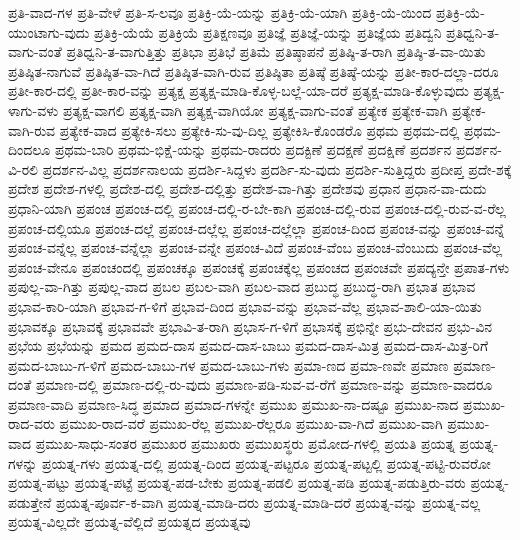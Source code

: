 {ಪ್ರತಿ-ವಾದ-ಗಳ
ಪ್ರತಿ-ವೇಳೆ
ಪ್ರತಿ-ಸ-ಲವೂ
ಪ್ರತಿಕ್ರಿ-ಯೆ-ಯನ್ನು
ಪ್ರತಿಕ್ರಿ-ಯೆ-ಯಾಗಿ
ಪ್ರತಿಕ್ರಿ-ಯೆ-ಯಿಂದ
ಪ್ರತಿಕ್ರಿ-ಯೆ-ಯುಂಟಾಗು-ವುದು
ಪ್ರತಿಕ್ರಿ-ಯೆಯೆ
ಪ್ರತಿಕ್ರಿಯೆ
ಪ್ರತಿಕ್ಷಣವೂ
ಪ್ರತಿಜ್ಞೆ
ಪ್ರತಿಜ್ಞೆ-ಯನ್ನು
ಪ್ರತಿಜ್ಞೆಯ
ಪ್ರತಿದ್ವನಿ
ಪ್ರತಿಧ್ವನಿ-ತ-ವಾಗು-ವಂತೆ
ಪ್ರತಿಧ್ವನಿ-ತ-ವಾಗುತ್ತಿತ್ತು
ಪ್ರತಿಭಾ
ಪ್ರತಿಭೆ
ಪ್ರತಿಮೆ
ಪ್ರತಿಷ್ಠಾಪನೆ
ಪ್ರತಿಷ್ಠಿ-ತ-ರಾಗಿ
ಪ್ರತಿಷ್ಠಿ-ತ-ವಾ-ಯಿತು
ಪ್ರತಿಷ್ಠಿತ-ನಾಗುವೆ
ಪ್ರತಿಷ್ಠಿತ-ವಾ-ಗಿದೆ
ಪ್ರತಿಷ್ಠಿತ-ವಾಗಿ-ರುವ
ಪ್ರತಿಷ್ಠಿತಾ
ಪ್ರತಿಷ್ಠೆ
ಪ್ರತಿಷ್ಠೆ-ಯನ್ನು
ಪ್ರತೀ-ಕಾರ-ದಲ್ಲಾ-ದರೂ
ಪ್ರತೀ-ಕಾರ-ದಲ್ಲಿ
ಪ್ರತೀ-ಕಾರ-ವನ್ನು
ಪ್ರತ್ಯಕ್ಷ
ಪ್ರತ್ಯಕ್ಷ-ಮಾಡಿ-ಕೊಳ್ಳ-ಬಲ್ಲೆ-ಯಾ-ದರೆ
ಪ್ರತ್ಯಕ್ಷ-ಮಾಡಿ-ಕೊಳ್ಳುವುದು
ಪ್ರತ್ಯಕ್ಷ-ಳಾಗು-ವಳು
ಪ್ರತ್ಯಕ್ಷ-ವಾಗಲಿ
ಪ್ರತ್ಯಕ್ಷ-ವಾಗಿ
ಪ್ರತ್ಯಕ್ಷ-ವಾಗಿಯೋ
ಪ್ರತ್ಯಕ್ಷ-ವಾಗು-ವಂತೆ
ಪ್ರತ್ಯೇಕ
ಪ್ರತ್ಯೇಕ-ವಾಗಿ
ಪ್ರತ್ಯೇಕ-ವಾಗಿ-ರುವ
ಪ್ರತ್ಯೇಕ-ವಾದ
ಪ್ರತ್ಯೇಕಿ-ಸಲು
ಪ್ರತ್ಯೇಕಿ-ಸು-ವು-ದಿಲ್ಲ
ಪ್ರತ್ಯೇಕಿಸಿ-ಕೊಂಡರೊ
ಪ್ರಥಮ
ಪ್ರಥಮ-ದಲ್ಲಿ
ಪ್ರಥಮ-ದಿಂದಲೂ
ಪ್ರಥಮ-ಬಾರಿ
ಪ್ರಥಮ-ಭಿಕ್ಷೆ-ಯನ್ನು
ಪ್ರಥಮ-ರಾದರು
ಪ್ರದಕ್ಟಿಣೆ
ಪ್ರದಕ್ಷಣೆ
ಪ್ರದಕ್ಷಿಣೆ
ಪ್ರದರ್ಶನ
ಪ್ರದರ್ಶನ-ವಿ-ರಲಿ
ಪ್ರದರ್ಶನ-ವಿಲ್ಲ
ಪ್ರದರ್ಶನಾಲಯ
ಪ್ರದರ್ಶಿ-ಸಿದ್ದಳು
ಪ್ರದರ್ಶಿ-ಸು-ವುದು
ಪ್ರದರ್ಶಿ-ಸುತ್ತಿದ್ದರು
ಪ್ರದೀಪ್ತ
ಪ್ರದೇ-ಶಕ್ಕೆ
ಪ್ರದೇಶ
ಪ್ರದೇಶ-ಗಳಲ್ಲಿ
ಪ್ರದೇಶ-ದಲ್ಲಿ
ಪ್ರದೇಶ-ದಲ್ಲಿತ್ತು
ಪ್ರದೇಶ-ವಾ-ಗಿತ್ತು
ಪ್ರದೇಶವು
ಪ್ರಧಾನ
ಪ್ರಧಾನ-ವಾ-ದುದು
ಪ್ರಧಾನಿ-ಯಾಗಿ
ಪ್ರಪಂಚ
ಪ್ರಪಂಚ-ದಲ್ಲಿ
ಪ್ರಪಂಚ-ದಲ್ಲಿ-ರ-ಬೇ-ಕಾಗಿ
ಪ್ರಪಂಚ-ದಲ್ಲಿ-ರುವ
ಪ್ರಪಂಚ-ದಲ್ಲಿ-ರುವ-ವ-ರೆಲ್ಲ
ಪ್ರಪಂಚ-ದಲ್ಲಿಯೂ
ಪ್ರಪಂಚ-ದಲ್ಲೆ
ಪ್ರಪಂಚ-ದಲ್ಲೆಲ್ಲ
ಪ್ರಪಂಚ-ದಲ್ಲೆಲ್ಲಾ
ಪ್ರಪಂಚ-ದಿಂದ
ಪ್ರಪಂಚ-ವನ್ನು
ಪ್ರಪಂಚ-ವನ್ನೆ
ಪ್ರಪಂಚ-ವನ್ನೆಲ್ಲ
ಪ್ರಪಂಚ-ವನ್ನೆಲ್ಲಾ
ಪ್ರಪಂಚ-ವನ್ನೇ
ಪ್ರಪಂಚ-ವಿದೆ
ಪ್ರಪಂಚ-ವೆಂಬ
ಪ್ರಪಂಚ-ವೆಂಬುದು
ಪ್ರಪಂಚ-ವೆಲ್ಲ
ಪ್ರಪಂಚ-ವೇನೂ
ಪ್ರಪಂಚಂದಲ್ಲಿ
ಪ್ರಪಂಚಕ್ಕೂ
ಪ್ರಪಂಚಕ್ಕೆ
ಪ್ರಪಂಚಕ್ಕೆಲ್ಲ
ಪ್ರಪಂಚದ
ಪ್ರಪಂಚವೇ
ಪ್ರಪದ್ಯನ್ತೇ
ಪ್ರಪಾತ-ಗಳು
ಪ್ರಪುಲ್ಲ-ವಾ-ಗಿತ್ತು
ಪ್ರಪುಲ್ಲ-ವಾದ
ಪ್ರಬಲ
ಪ್ರಬಲ-ವಾಗಿ
ಪ್ರಬಲ-ವಾದ
ಪ್ರಬುದ್ಧ
ಪ್ರಬುದ್ಧ-ರಾಗಿ
ಪ್ರಭಾತ
ಪ್ರಭಾವ
ಪ್ರಭಾವ-ಕಾರಿ-ಯಾಗಿ
ಪ್ರಭಾವ-ಗ-ಳಿಗೆ
ಪ್ರಭಾವ-ದಿಂದ
ಪ್ರಭಾವ-ವನ್ನು
ಪ್ರಭಾವ-ವೆಲ್ಲ
ಪ್ರಭಾವ-ಶಾಲಿ-ಯಾ-ಯಿತು
ಪ್ರಭಾವಕ್ಕೂ
ಪ್ರಭಾವಕ್ಕೆ
ಪ್ರಭಾವವೇ
ಪ್ರಭಾವಿ-ತ-ರಾಗಿ
ಪ್ರಭಾಸ-ಗ-ಳಿಗೆ
ಪ್ರಭಾಸಕ್ಕೆ
ಪ್ರಭಿನ್ನೇ
ಪ್ರಭು-ದೇವನ
ಪ್ರಭು-ವಿನ
ಪ್ರಭೆಯ
ಪ್ರಭೆಯನ್ನು
ಪ್ರಮದ
ಪ್ರಮದ-ದಾಸ
ಪ್ರಮದ-ದಾಸ-ಬಾಬು
ಪ್ರಮದ-ದಾಸ-ಮಿತ್ರ
ಪ್ರಮದ-ದಾಸ-ಮಿತ್ರ-ರಿಗೆ
ಪ್ರಮದ-ಬಾಬು-ಗ-ಳಿಗೆ
ಪ್ರಮದ-ಬಾಬು-ಗಳ
ಪ್ರಮದ-ಬಾಬು-ಗಳು
ಪ್ರಮಾ-ಣದ
ಪ್ರಮಾ-ಣವೇ
ಪ್ರಮಾಣ
ಪ್ರಮಾಣ-ದಂತೆ
ಪ್ರಮಾಣ-ದಲ್ಲಿ
ಪ್ರಮಾಣ-ದಲ್ಲಿ-ರು-ವುದು
ಪ್ರಮಾಣ-ಪಡಿ-ಸುವ-ವ-ರೆಗೆ
ಪ್ರಮಾಣ-ವನ್ನು
ಪ್ರಮಾಣ-ವಾದರೂ
ಪ್ರಮಾಣ-ವಾದಿ
ಪ್ರಮಾಣ-ಸಿದ್ಧ
ಪ್ರಮಾದ
ಪ್ರಮಾದ-ಗಳನ್ನೇ
ಪ್ರಮುಖ
ಪ್ರಮುಖ-ನಾ-ದಷ್ಟೂ
ಪ್ರಮುಖ-ನಾದ
ಪ್ರಮುಖ-ರಾದ-ವರು
ಪ್ರಮುಖ-ರಾದ-ವರೆ
ಪ್ರಮುಖ-ರೆಲ್ಲ
ಪ್ರಮುಖ-ರೆಲ್ಲರೂ
ಪ್ರಮುಖ-ವಾ-ಗಿದೆ
ಪ್ರಮುಖ-ವಾಗಿ
ಪ್ರಮುಖ-ವಾದ
ಪ್ರಮುಖ-ಸಾಧು-ಸಂತರ
ಪ್ರಮುಖರ
ಪ್ರಮುಖರು
ಪ್ರಮುಖಸ್ಥರು
ಪ್ರಮೋದ-ಗಳಲ್ಲಿ
ಪ್ರಯತಿ
ಪ್ರಯತ್ನ
ಪ್ರಯತ್ನ-ಗಳನ್ನು
ಪ್ರಯತ್ನ-ಗಳು
ಪ್ರಯತ್ನ-ದಲ್ಲಿ
ಪ್ರಯತ್ನ-ದಿಂದ
ಪ್ರಯತ್ನ-ಪಟ್ಟರೂ
ಪ್ರಯತ್ನ-ಪಟ್ಟಲ್ಲಿ
ಪ್ರಯತ್ನ-ಪಟ್ಟಿ-ರುವರೋ
ಪ್ರಯತ್ನ-ಪಟ್ಟು
ಪ್ರಯತ್ನ-ಪಟ್ಟೆ
ಪ್ರಯತ್ನ-ಪಡ-ಬೇಕು
ಪ್ರಯತ್ನ-ಪಡಲಿ
ಪ್ರಯತ್ನ-ಪಡಿ
ಪ್ರಯತ್ನ-ಪಡುತ್ತಿರು-ವರು
ಪ್ರಯತ್ನ-ಪಡುತ್ತೇನೆ
ಪ್ರಯತ್ನ-ಪೂರ್ವ-ಕ-ವಾಗಿ
ಪ್ರಯತ್ನ-ಮಾಡಿ-ದರು
ಪ್ರಯತ್ನ-ಮಾಡಿ-ದರೆ
ಪ್ರಯತ್ನ-ವನ್ನು
ಪ್ರಯತ್ನ-ವಲ್ಲ
ಪ್ರಯತ್ನ-ವಿಲ್ಲದೇ
ಪ್ರಯತ್ನ-ವೆಲ್ಲಿದೆ
ಪ್ರಯತ್ನದ
ಪ್ರಯತ್ನವು
}
